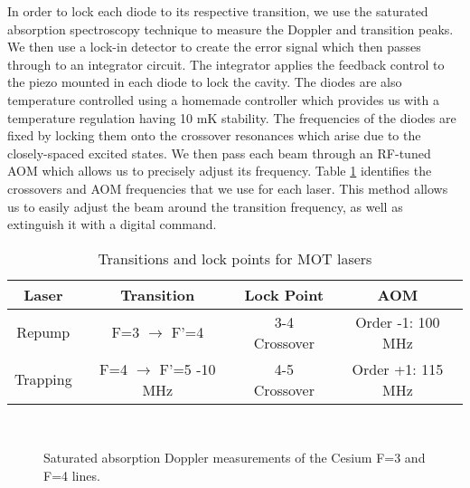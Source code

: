In order to lock each diode to its respective transition, we use the saturated
absorption spectroscopy technique to measure the Doppler and
transition peaks.  We then use a lock-in detector to create the error signal
which then passes through to an integrator circuit.  The integrator applies
the feedback control to the piezo mounted in each diode to lock the cavity.
The diodes are also temperature controlled using a homemade controller which
provides us with a temperature regulation having 10 mK stability.  The
frequencies of the diodes are fixed by locking them onto the crossover
resonances which arise due to the closely-spaced excited states.
We then pass each beam through an RF-tuned AOM which allows us to precisely
adjust its frequency.  Table \ref{sat_abs_locks} identifies the crossovers and
AOM frequencies that we use for each laser.  This method allows us to easily adjust the beam around the transition frequency, as well as extinguish it with a digital command.


\begin{table}[ht]
  \centering
  \begin{tabular}{| c | c | c | c |}
    \hline
    Laser & Transition & Lock Point & AOM \\
    \hline
    Repump & F=3 $\to$ F'=4 & 3-4 Crossover  & Order -1: 100 MHz\\
    Trapping & F=4 $\to$ F'=5 -10 MHz  & 4-5 Crossover & Order +1: 115 MHz\\
    \hline
  \end{tabular}
\caption{Transitions and lock points for MOT lasers}
\label{sat_abs_locks}
\end{table}



\begin{figure}[!ht]
  \centering
  \hspace{-10pts}
   \\
  \caption[Saturated absorption Doppler measurements]{Saturated absorption Doppler measurements of the Cesium F=3 and F=4 lines.}
  \label{fig:sat_abs}
\end{figure}


